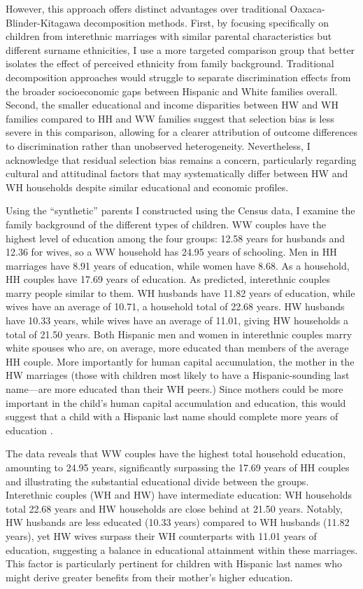 However, this approach offers distinct advantages over traditional Oaxaca-Blinder-Kitagawa decomposition methods. First, by focusing specifically on children from interethnic marriages with similar parental characteristics but different surname ethnicities, I use a more targeted comparison group that better isolates the effect of perceived ethnicity from family background. Traditional decomposition approaches would struggle to separate discrimination effects from the broader socioeconomic gaps between Hispanic and White families overall. Second, the smaller educational and income disparities between HW and WH families compared to HH and WW families suggest that selection bias is less severe in this comparison, allowing for a clearer attribution of outcome differences to discrimination rather than unobserved heterogeneity. Nevertheless, I acknowledge that residual selection bias remains a concern, particularly regarding cultural and attitudinal factors that may systematically differ between HW and WH households despite similar educational and economic profiles.

Using the “synthetic” parents I constructed using the Census data, I examine the family background of the different types of children. WW couples have the highest level of education among the four groups: 12.58 years  for husbands and 12.36 for wives, so a WW household has 24.95 years of schooling. Men in HH marriages have 8.91 years of education, while women have 8.68. As a household, HH couples have 17.69 years of education. As predicted, interethnic couples marry people similar to them. WH husbands have 11.82 years of education, while wives have an average of 10.71, a household total of 22.68 years. HW husbands have 10.33 years, while wives have an average of 11.01, giving HW households a total of 21.50 years. Both  Hispanic men and women in interethnic couples marry white spouses who are, on average, more educated than members of the average HH couple. More importantly for human capital accumulation, the mother in the HW marriages (those with children most likely to have a Hispanic-sounding last name—are more educated than their WH peers.) Since mothers could be more important in the child’s human capital accumulation and education, this would suggest that a child with a Hispanic last name should complete more years of education  \autocite{gould2020does}.

The data reveals that WW couples have the highest total household education, amounting to 24.95 years, significantly surpassing the 17.69 years of HH couples and illustrating the substantial educational divide between the groups. Interethnic couples (WH and HW) have intermediate education: WH households total 22.68 years and HW households are close behind at 21.50 years. Notably, HW husbands are less educated (10.33 years) compared to WH husbands (11.82 years), yet HW wives surpass their WH counterparts with 11.01 years of education, suggesting a balance in educational attainment within these marriages. This factor is particularly pertinent for children with Hispanic last names who might derive greater benefits from their mother’s higher education.

